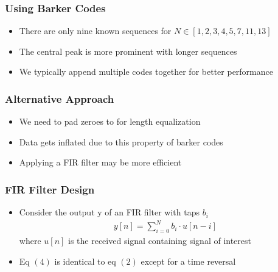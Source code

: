 \documentclass[10pt]{beamer}
\begin{document}
\frame
{
  \frametitle{Using Barker Codes}

    \begin{itemize}
        \item There are only nine known sequences for $N \in [1,2,3,4,5,7,11,13]$  
        \item The central peak is more prominent with longer sequences
        \item We typically append multiple codes together for better performance
    \end{itemize}

}

\frame
{
  \frametitle{Alternative Approach}

    \begin{itemize}
        \item We need to pad zeroes to for length equalization
        \item Data gets inflated due to this property of barker codes
        \item Applying a FIR filter may be more efficient

    \end{itemize}

}

\frame
{
  \frametitle{FIR Filter Design}

    \begin{itemize}
        \item Consider the output y of an FIR filter with taps $b_i$
        \begin{equation}
        \begin{split}
            y[n]= \sum_{i=0}^{N} b_i\cdot{u[n-i]}
        \end{split}
        \end{equation}
		 where $u[n]$ is the received signal containing signal of interest
		 \item Eq $(4)$ is identical to eq $(2)$ except for a time reversal
    \end{itemize}

}
\end{document}
